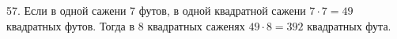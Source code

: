 57. Если в одной сажени 7 футов, в одной квадратной сажени $7\cdot7=49$ квадратных футов. Тогда в 8 квадратных саженях $49\cdot8=392$ квадратных фута.\\
